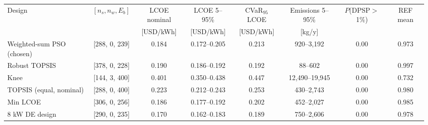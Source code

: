 \begin{tabular}{lccccccc}
\toprule
Design & $[n_s, n_w, E_b]$ & LCOE nominal & LCOE 5--95\% & CVaR$_{95}$ LCOE & Emissions 5--95\% & $P$(DPSP$>$1\%) & REF mean\\
 & & [USD/kWh] & [USD/kWh] & [USD/kWh] & [kg/y] & & \\
\midrule
Weighted-sum PSO (chosen) & [288, 0, 239] & 0.184 & 0.172--0.205 & 0.213 & 920--3,192 & 0.00 & 0.973\\
Robust TOPSIS & [378, 0, 228] & 0.190 & 0.186--0.192 & 0.192 & 88--602 & 0.00 & 0.997\\
Knee & [144, 3, 400] & 0.401 & 0.350--0.438 & 0.447 & 12,490--19,945 & 0.00 & 0.732\\
TOPSIS (equal, nominal) & [288, 0, 400] & 0.223 & 0.212--0.243 & 0.253 & 430--2,743 & 0.00 & 0.980\\
Min LCOE & [306, 0, 256] & 0.186 & 0.177--0.192 & 0.202 & 452--2,027 & 0.00 & 0.985\\
8 kW DE design & [290, 0, 235] & 0.170 & 0.162--0.183 & 0.189 & 750--2,606 & 0.00 & 0.978\\
\bottomrule
\end{tabular}
